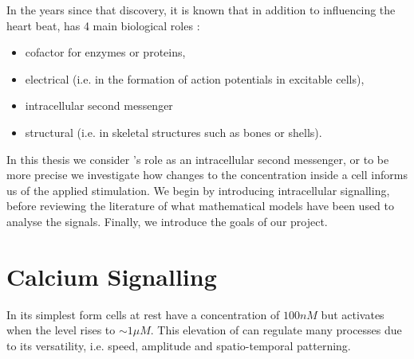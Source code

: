 \documentclass[../main.tex]{subfiles}
\begin{document}
 In the years since that discovery, it is known that in addition to influencing the heart beat,  has 4 main biological roles \cite{}:
 \begin{itemize}
 \item cofactor for enzymes or proteins,
 \item electrical (i.e. in the formation of action potentials in excitable cells),
 \item intracellular second messenger
 \item structural (i.e. in skeletal structures such as bones or shells).
 \end{itemize} 
 
 In this thesis we consider  's role as an intracellular second messenger, or to be more precise we investigate how changes to the    concentration inside a cell informs us of the applied stimulation. We begin by introducing intracellular   signalling, before reviewing the literature of what mathematical models have been used to analyse the signals. Finally, we introduce the goals of our project. 
 
 \section{Calcium Signalling}
 In its simplest form cells at rest have a  concentration of $100nM$ but activates when the level rises to $\sim 1 \mu M$. This elevation of  can regulate many processes due to its versatility, i.e. speed, amplitude and spatio-temporal patterning.    
\end{document}
